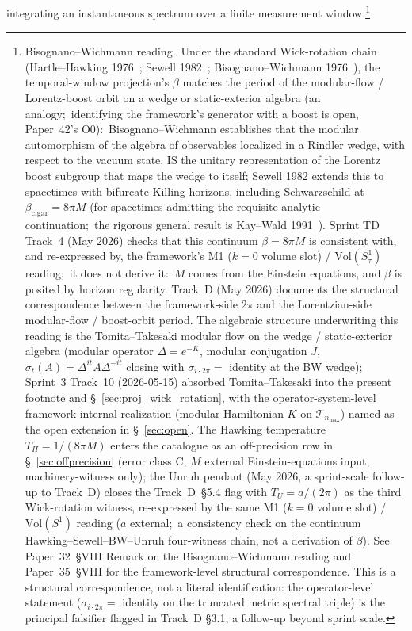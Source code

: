 \documentclass[11pt]{article}
\begin{document}
integrating an instantaneous spectrum over a finite measurement window.\footnote{%
Bisognano--Wichmann reading.\ Under the standard Wick-rotation chain
(Hartle--Hawking 1976~\cite{hartle_hawking1976};
 Sewell 1982~\cite{sewell1982};
 Bisognano--Wichmann 1976~\cite{bisognano_wichmann1976}),
the temporal-window projection's $\beta$ matches the period of the
modular-flow / Lorentz-boost orbit on a wedge or static-exterior
algebra (an analogy;\ identifying the framework's generator with a boost
is open, Paper~42's O0):\ Bisognano--Wichmann establishes that the modular automorphism
of the algebra of observables localized in a Rindler wedge, with
respect to the vacuum state, IS the unitary representation of the
Lorentz boost subgroup that maps the wedge to itself; Sewell 1982
extends this to spacetimes with bifurcate Killing horizons, including
Schwarzschild at $\beta_{\mathrm{cigar}} = 8\pi M$ (for spacetimes
admitting the requisite analytic continuation;\ the rigorous general
result is Kay--Wald 1991~\cite{kay_wald1991}).  Sprint TD Track~4
(May 2026) checks that this
continuum $\beta = 8\pi M$ is consistent with, and re-expressed by, the
framework's M1 ($k = 0$ volume slot) / $\mathrm{Vol}(S^1_\tau)$ reading;\
it does not derive it:\ $M$ comes from the Einstein equations, and
$\beta$ is posited by horizon regularity.  Track~D
(May 2026)
documents the structural correspondence between the framework-side
$2\pi$ and the Lorentzian-side modular-flow / boost-orbit period.
The algebraic structure underwriting this reading is the
Tomita--Takesaki modular flow on the wedge / static-exterior algebra
(modular operator $\Delta = e^{-K}$, modular conjugation $J$,
$\sigma_t(A) = \Delta^{it}A\Delta^{-it}$ closing with $\sigma_{i\cdot 2\pi}
= $ identity at the BW wedge); Sprint~3 Track~10 (2026-05-15)
absorbed Tomita--Takesaki into the present footnote and \S~\ref{sec:proj_wick_rotation},
with the operator-system-level framework-internal realization (modular
Hamiltonian $K$ on $\mathcal{T}_{n_{\max}}$) named as the open extension
in \S~\ref{sec:open}.  The
Hawking temperature $T_H = 1/(8\pi M)$ enters the catalogue as an
off-precision row in \S~\ref{sec:offprecision} (error class
C, $M$ external Einstein-equations input, machinery-witness only); the
Unruh pendant (May 2026,
a sprint-scale follow-up to Track~D) closes the Track~D~\S 5.4 flag with
$T_U = a/(2\pi)$ as the third Wick-rotation witness, re-expressed by the
same M1 ($k = 0$ volume slot) / $\mathrm{Vol}(S^1)$ reading ($a$ external;\
a consistency check on the continuum Hawking--Sewell--BW--Unruh
four-witness chain, not a derivation of $\beta$).  See Paper~32~§VIII Remark on the
Bisognano--Wichmann reading and Paper~35~§VIII for the framework-level
structural correspondence.  This is a structural correspondence, not a
literal identification: the operator-level statement
($\sigma_{i\cdot 2\pi} = $ identity on the truncated metric spectral
triple) is the principal falsifier flagged in Track~D \S 3.1, a
follow-up beyond sprint scale.
}
\end{document}
